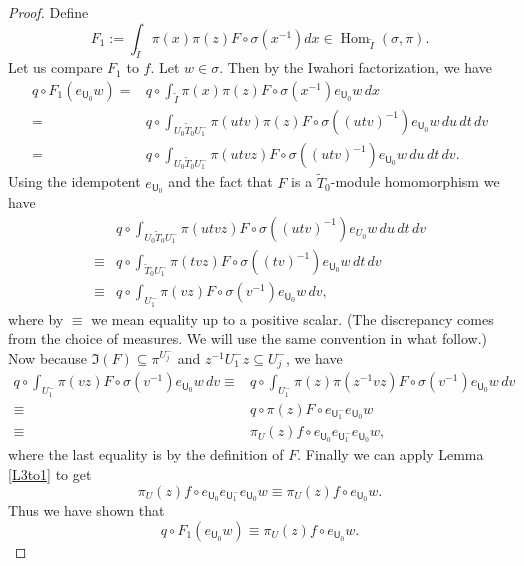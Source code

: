 \documentclass[10pt, letterpaper]{amsart}
\theoremstyle{plain}
\theoremstyle{definition}
\numberwithin{equation}{section}
\newcommand{\It}{\widetilde{I}}
\newcommand{\Tt}{\widetilde{T}}
\newcommand{\Hom}{\operatorname{Hom}}
\newcommand{\Uf}{\mathsf{U}}
\begin{document}
\begin{proof}
    Define
    \[
    F_{1}:=\int_{\It}\pi(x)\pi(z)F\circ \sigma(x^{-1})dx\in\Hom_{\It}(\sigma,\pi).
    \]
    Let us compare $F_1$ to $f$. Let $w\in \sigma$. Then by the Iwahori factorization, we have
	\begin{align*}
		q\circ F_1(e_{{\Uf}_{0}}w)=&q\circ \int_{\It} \pi(x)\pi(z)F\circ \sigma(x^{-1}) e_{{\Uf}_{0}}w\,dx\\
		=&q\circ \int_{U_{0}\Tt_{0}U^{-}_{1}} \pi(utv)\pi(z)F\circ \sigma((utv)^{-1}) e_{{\Uf}_{0}}w \,du\,dt\,dv\\
		=&q\circ \int_{U_{0}\Tt_{0}U^{-}_{1}} \pi(utvz)F\circ \sigma((utv)^{-1}) e_{{\Uf}_{0}}w \,du\,dt\,dv.
	\end{align*}
	Using the idempotent $e_{{\Uf}_{0}}$ and the fact that $F$ is a $\Tt_{0}$-module homomorphism we have 
	\begin{align*}
		&q\circ \int_{U_{0}\Tt_{0}U^{-}_{1}} \pi(utvz)F\circ \sigma((utv)^{-1}) e_{U_{0}}w \,du\, dt\, dv\\
        \equiv&q\circ \int_{\Tt_{0}U^{-}_{1}} \pi(tvz)F\circ \sigma((tv)^{-1}) e_{{\Uf}_{0}}w \,dt\,dv\\
		\equiv&q\circ \int_{U^{-}_{1}} \pi(vz)F\circ \sigma(v^{-1}) e_{{\Uf}_{0}}w \,dv,
	\end{align*}
    where by $\equiv$ we mean equality up to a positive scalar. (The discrepancy comes from the choice of measures. We will use the same convention in what follow.)
	Now because $\Im(F)\subseteq \pi^{U^{-}_{j}}$ and  $z^{-1}U^{-}_{1}z\subseteq U^{-}_{j}$, we have
	\begin{align*}
		q\circ \int_{U^{-}_{1}} \pi(vz)F\circ \sigma(v^{-1}) e_{{\Uf}_{0}}w \,dv
        \equiv&q\circ \int_{U^{-}_{1}} \pi(z)\pi(z^{-1}vz)F\circ \sigma(v^{-1}) e_{{\Uf}_{0}}w \,dv\\
		\equiv&q\circ \pi(z)F\circ e_{{\Uf}^{-}_{1}}e_{{\Uf}_{0}}w\\
		\equiv&\pi_{U}(z)f \circ e_{{\Uf}_{0}}e_{{\Uf}^{-}_{1}}e_{{\Uf}_{0}}w,
	\end{align*}
    where the last equality is by the definition of $F$. Finally we can apply Lemma \ref{L3to1} to get 
	\begin{equation*}
		\pi_{U}(z)f \circ e_{{\Uf}_{0}}e_{{\Uf}^{-}_{1}}e_{{\Uf}_{0}}w\equiv\pi_{U}(z)f \circ e_{{\Uf}_{0}}w.
	\end{equation*}
	Thus we have shown that
	\begin{equation}\label{SurjEq1}
		q\circ F_1(e_{{\Uf}_{0}}w)\equiv\pi_{U}(z)f \circ e_{{\Uf}_{0}}w.
	\end{equation}
	

\end{proof}
\end{document}
